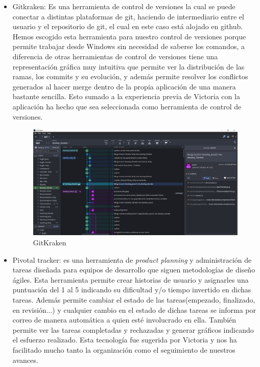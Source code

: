 \documentclass[11pt]{book}
\begin{document}
\begin{itemize}
	\item Gitkraken: Es una herramienta de control de versiones la cual se puede conectar a distintas plataformas de git, haciendo de intermediario entre el usuario y el repositorio de git, el cual en este caso está alojado en github. Hemos escogido esta herramienta para nuestro control de versiones porque permite trabajar desde Windows sin necesidad de saberse los comandos, a diferencia de otras herramientas de control de versiones tiene una representación gráfica muy intuitiva que permite ver la distribución de las ramas, los commits y su evolución, y además permite resolver los conflictos generados al hacer merge dentro de la propia aplicación de una manera bastante sencilla. Esto sumado a la experiencia previa de Victoria con la aplicación ha hecho que sea seleccionada como herramienta de control de versiones.
	\begin{figure}
		\centering
		\includegraphics[scale=0.4]{gitkraken}
		\caption{GitKraken}
	\end{figure}
	
	\item Pivotal tracker: es una herramienta de \emph{product planning} y administración de tareas diseñada para equipos de desarrollo que siguen metodologías de diseño ágiles.
	Esta herramienta permite crear historias de usuario y asignarles una puntuación del 1 al 5 indicando su dificultad y/o tiempo invertido en dichas tareas. Además permite cambiar el estado de las tareas(empezado, finalizado, en revisión...) y cualquier cambio en el estado de dichas tareas se informa por correo de manera automática a quien esté involucrado en ella.
	También permite ver las tareas completadas y rechazadas y generar gráficos indicando el esfuerzo realizado. Esta tecnología fue sugerida por Victoria y nos ha facilitado mucho tanto la organización como el seguimiento de nuestros avances.
	

\end{itemize}
\end{document}
